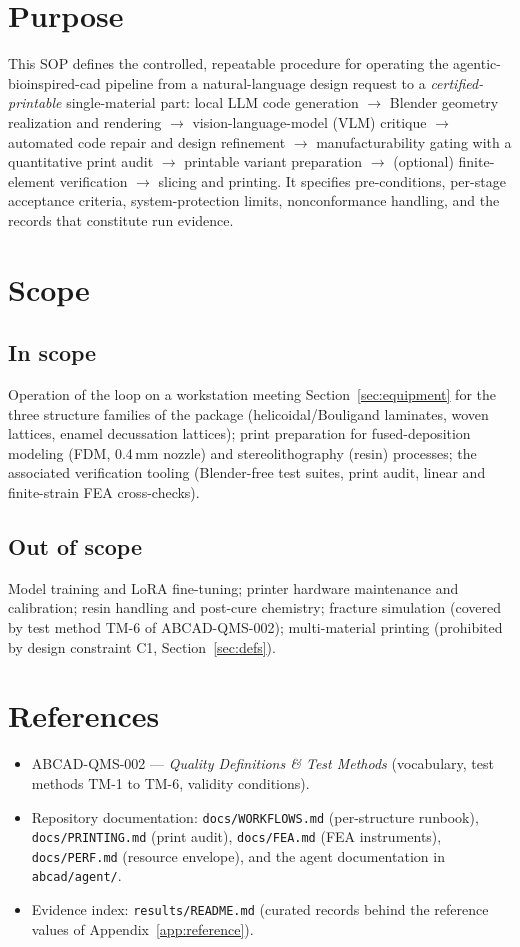 \documentclass[11pt]{article}
\begin{document}
\section{Purpose}
This SOP defines the controlled, repeatable procedure for operating the agentic-bioinspired-cad pipeline
from a natural-language design request to a \emph{certified-printable} single-material part: local LLM
code generation $\rightarrow$ Blender geometry realization and rendering $\rightarrow$
vision-language-model (VLM) critique $\rightarrow$ automated code repair and design refinement
$\rightarrow$ manufacturability gating with a quantitative print audit $\rightarrow$ printable variant
preparation $\rightarrow$ (optional) finite-element verification $\rightarrow$ slicing and printing.
It specifies pre-conditions, per-stage acceptance criteria, system-protection limits, nonconformance
handling, and the records that constitute run evidence.

\section{Scope}
\subsection{In scope}
Operation of the loop on a workstation meeting Section~\ref{sec:equipment} for the three structure
families of the package (helicoidal/Bouligand laminates, woven lattices, enamel decussation lattices);
print preparation for fused-deposition modeling (FDM, 0.4\,mm nozzle) and stereolithography (resin)
processes; the associated verification tooling (Blender-free test suites, print audit, linear and
finite-strain FEA cross-checks).

\subsection{Out of scope}
Model training and LoRA fine-tuning; printer hardware maintenance and calibration; resin handling and
post-cure chemistry; fracture simulation (covered by test method TM-6 of ABCAD-QMS-002); multi-material
printing (prohibited by design constraint C1, Section~\ref{sec:defs}).

\section{References}
\begin{itemize}[nosep]
  \item ABCAD-QMS-002 --- \emph{Quality Definitions \& Test Methods} (vocabulary, test methods TM-1 to TM-6,
        validity conditions).
  \item Repository documentation: \texttt{docs/WORKFLOWS.md} (per-structure runbook),
        \texttt{docs/PRINTING.md} (print audit), \texttt{docs/FEA.md} (FEA instruments),
        \texttt{docs/PERF.md} (resource envelope), and the agent documentation in \texttt{abcad/agent/}.
  \item Evidence index: \texttt{results/README.md} (curated records behind the reference values of
        Appendix~\ref{app:reference}).
\end{itemize}
\end{document}
